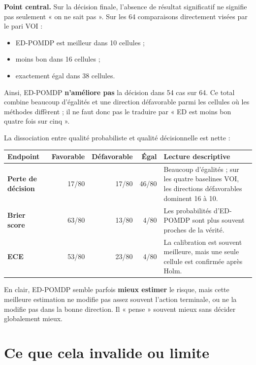 \documentclass[11pt,a4paper]{article}
\begin{document}
\begin{tcolorbox}[colback=softamber,colframe=orange!70!black,boxrule=0.7pt,arc=2mm]
\textbf{Point central.} Sur la décision finale, l'absence de résultat significatif ne signifie pas seulement « on ne sait pas ». Sur les 64 comparaisons directement visées par le pari VOI :
\begin{itemize}
  \item ED-POMDP est meilleur dans 10 cellules ;
  \item moins bon dans 16 cellules ;
  \item exactement égal dans 38 cellules.
\end{itemize}
Ainsi, ED-POMDP \textbf{n'améliore pas} la décision dans 54 cas sur 64. Ce total combine beaucoup d'égalités et une direction défavorable parmi les cellules où les méthodes diffèrent ; il ne faut donc pas le traduire par « ED est moins bon quatre fois sur cinq ».
\end{tcolorbox}

La dissociation entre qualité probabiliste et qualité décisionnelle est nette :

\begin{center}
\begin{tabularx}{\textwidth}{>{\bfseries}l r r r X}
\toprule
Endpoint & Favorable & Défavorable & Égal & Lecture descriptive \\
\midrule
Perte de décision & 17/80 & 17/80 & 46/80 & Beaucoup d'égalités ; sur les quatre baselines VOI, les directions défavorables dominent 16 à 10. \\
Brier score & 63/80 & 13/80 & 4/80 & Les probabilités d'ED-POMDP sont plus souvent proches de la vérité. \\
ECE & 53/80 & 23/80 & 4/80 & La calibration est souvent meilleure, mais une seule cellule est confirmée après Holm. \\
\bottomrule
\end{tabularx}
\end{center}

En clair, ED-POMDP semble parfois \textbf{mieux estimer} le risque, mais cette meilleure estimation ne modifie pas assez souvent l'action terminale, ou ne la modifie pas dans la bonne direction. Il « pense » souvent mieux sans décider globalement mieux.

\section*{Ce que cela invalide ou limite}
\end{document}
